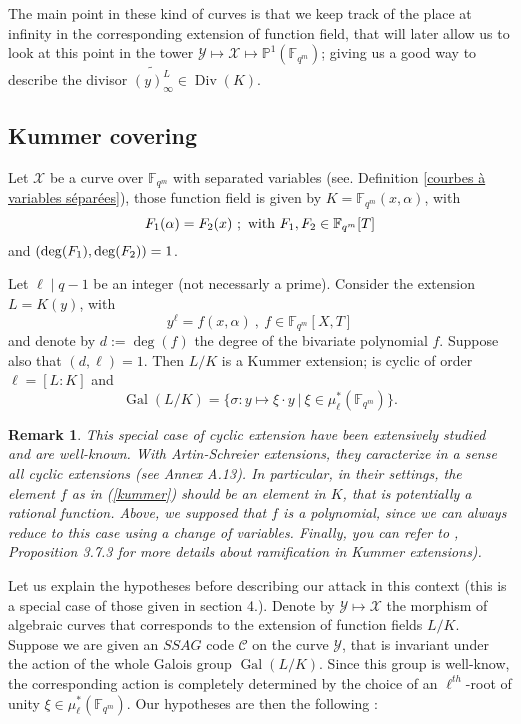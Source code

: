 \documentclass[10pt]{article}
\newtheorem{rq1}[thm]{Remark}
\newcommand{\s}{\vspace{0.3cm}}
\newcommand{\cd}{\cdot}
\newcommand{\PP}{\mathbb{P}}
\newcommand{\fqm}{\mathbb{F}_{q^m}}
\newcommand{\X}{\mathcal{X}}
\newcommand{\Y}{\mathcal{Y}}
\newcommand{\Div}{\operatorname{Div}}
\newcommand{\Gal}{\operatorname{Gal}}
\begin{document}
The main point in these kind of curves is that we keep track of the place at infinity in the corresponding extension of function field, that will later allow us to look at this point in the tower $\Y \longmapsto \X \longmapsto \PP^1(\fqm)$; giving us a good way to describe the divisor $\widetilde{(y)_{\infty}^L} \in \Div(K)$.


\s

\subsection{Kummer covering}

\s

Let $\X$ be a curve over $\fqm$ with separated variables (see. Definition \ref{courbes à variables séparées}), those function field is given by $K=\fqm(x,\alpha)$, with
\[F_1(\alpha) = F_2(x) \ ; \textrm{ with }  F_1,F_{\rm 2} \in \fqm[T] \]
and $(\deg(F_1),\deg(F_{\rm{2}}))=1$. 

\s

Let $\ell \mid q-1$ be an integer (not necessarly a prime). Consider the extension $L=K(y)$, with
\begin{equation} \label{kummer}
y^{\ell} = f(x,\alpha) \ , \ f \in \fqm[X,T] 
\end{equation}
and denote by $d:=\deg(f)$ the degree of the bivariate polynomial $f$. Suppose also that $(d,\ell)=1$. Then $L/K$ is a Kummer extension; is cyclic of order $\ell=[L:K]$ and 
\[\Gal(L/K) = \{ \sigma : y \mapsto \xi \cd y \ | \ \xi \in \mu^*_{\ell}(\fqm)\}.\] 

\s

\begin{rq1} \label{pk des polynômes}
This special case of cyclic extension have been extensively studied and are well-known. With Artin-Schreier extensions, they caracterize in a sense all cyclic extensions (see \cite{Sti} Annex A.13). In particular, in their settings, the element $f$ as in (\ref{kummer}) should be an element in $K$, that is potentially a rational function. Above, we supposed that $f$ is a polynomial, since we can always reduce to this case using a change of variables. Finally, you can refer to \cite{Sti}, Proposition 3.7.3 for more details about ramification in Kummer extensions).
\end{rq1}

\s

Let us explain the hypotheses before describing our attack in this context (this is a special case of those given in section 4.). Denote by $\Y \longmapsto \X$ the morphism of algebraic curves that corresponds to the extension of function fields $L/K$. Suppose we are given an $SSAG$ code $\mathcal{C}$ on the curve $\Y$, that is invariant under the action of the whole Galois group $\Gal(L/K)$. Since this group is well-know, the corresponding action is completely determined by the choice of an $\ell^{th}$-root of unity $\xi \in \mu^*_{\ell}(\fqm)$. Our hypotheses are then the following :
\end{document}
